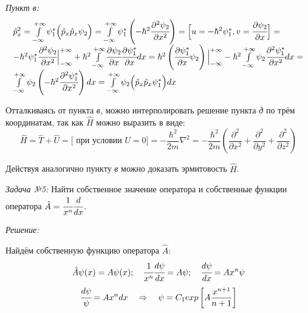 \emph{Пункт в:}
\[
\begin{array}{ll}
	\hat{p}^2_x = \int\limits_{-\infty}^{+\infty} \psi_{1}^{*} \Big( \hat{p}_{x} 
		\hat{p}_{x} \psi_{2} \Big) = 
		\int\limits_{-\infty}^{+\infty} \psi_{1}^{*} \left( 
		-\hbar^{2} \cfrac{\partial^{2} \psi_{2}}{\partial x^2} \right) =
		\Big[ u = -\hbar^2 \psi_{1}^{*}, 
		v = \cfrac{\partial \psi_{2}}{\partial x} \Big] = \\
		-\hbar^{2} \psi_{1}^{*} \cfrac{\partial^{2} \psi_{2}}{\partial x^2} 
		\Big\vert_{-\infty}^{+\infty} + \hbar^{2} \int\limits_{-\infty}^{+\infty}
		\cfrac{\partial\psi_{2}}{\partial x}
		\cfrac{\partial\psi_{1}^{*}}{\partial x} dx =
		\hbar^{2}\left( 
		\cfrac{\partial\psi_{1}^{*}}{\partial x} \psi_{2}\right)
		\Big\vert_{-\infty}^{+\infty} -\hbar^{2} \int\limits_{-\infty}^{+\infty} 
		\psi_{2} \cfrac{\partial^{2}\psi_{1}^{*}}{\partial x^2} dx = \\
		\int\limits_{-\infty}^{+\infty} \psi_{2} 
		\left( -\hbar^{2} \cfrac{\partial^{2}\psi_{1}^{*}}{\partial x^2} \right)dx =
		\int\limits_{-\infty}^{+\infty} \psi_{2} 
		\Big( \hat{p}_{x} \hat{p}_{x} \psi_{1}^{*} \Big) dx 
\end{array}
\]

Отталкиваясь от пункта \emph{в}, можно интерполировать решение пункта \emph{д} по 
трём координатам, так как \( \hat{H} \) можно выразить в виде:
\[
	\hat{H} = \hat{T} + \hat{U} = \Big[ \text{ при условии } U = 0 \Big] = 
	-\frac{\hbar^2}{2m}\nabla^{2} = -\frac{\hbar^2}{2m}\left( 
	\frac{\partial^2}{\partial x^2} + \frac{\partial^2}{\partial y^2} + 
	\frac{\partial^2}{\partial z^2}\right)
\]

Действуя аналогично пункту \emph{в} можно доказать эрмитовость \( \hat{H} \).

\pagebreak

\emph{Задача №5:} Найти собственное значение оператора и собственные функции 
оператора \( \hat{A} = \cfrac{1}{x^n}\cfrac{d}{dx} \).

\emph{Решение:}

Найдём собственную функцию оператора \( \hat{A} \):
\[
	\hat{A}\psi(x) = A\psi(x); \quad
	\cfrac{1}{x^n}\cfrac{d\psi}{dx} = A\psi; \quad
	\cfrac{d\psi}{dx} = A x^n \psi
\]
\[
	\cfrac{d\psi}{\psi} = A x^n dx \quad \Rightarrow \quad
	\psi = C_1 exp\left[ A \frac{x^{n+1}}{n+1} \right]
\]



